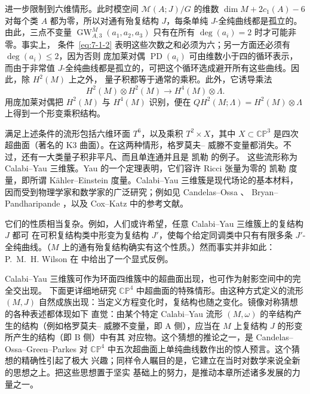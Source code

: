 进一步限制到六维情形。此时模空间 $\mathcal M(A;J)/G$ 的维数
$\dim M+2c_1(A)-6$ 对每个类 $A$ 都为零，所以对通有殆复结构 $J$，每条单纯
$J$-全纯曲线都是孤立的。由此，三点不变量
$\operatorname{GW}_{A,3}^M(a_1,a_2,a_3)$ 只有在所有 $\deg(a_i)=2$ 时才可能非零。事实上，
条件~\eqref{eq:7-1-2} 表明这些次数之和必须为六；另一方面还必须有 $\deg(a_i)\leq2$，因为否则
庞加莱对偶 $\operatorname{PD}(a_i)$ 可由维数小于四的循环表示，而由于非常值
$J$-全纯曲线都是孤立的，可把这个循环选成避开所有这些曲线。因此，除 $H^2(M)$ 上之外，
量子积都等于通常的乘积。此外，它诱导乘法
\[
  H^2(M)\otimes H^2(M)\longrightarrow H^4(M)\otimes\Lambda.
\]
用庞加莱对偶把 $H^2(M)$ 与 $H^4(M)$ 识别，便在
$QH^2(M;\Lambda)=H^2(M)\otimes\Lambda$ 上得到一个形变乘积结构。

满足上述条件的流形包括六维环面 $T^6$，以及乘积 $T^2\times X$，其中
$X\subset\mathbb{CP}^3$ 是四次超曲面（著名的 K3 曲面）。在这两种情形，格罗莫夫--
威滕不变量都消失。不过，还有一大类量子积非平凡、而且单连通并且是 凯勒 的例子。
这些流形称为 Calabi--Yau 三维簇。Yau 的一个定理表明，它们容许 Ricci 张量为零的
凯勒 度量，即所谓 Kähler--Einstein 度量。Calabi--Yau 三维簇是现代场论的基本材料，
因而受到物理学家和数学家的广泛研究；例如见 Candelas--Ossa 、
Bryan--Pandharipande ，以及 Cox--Katz  中的参考文献。

它们的性质相当复杂。例如，人们或许希望，任意 Calabi--Yau 三维簇上的复结构 $J$ 都可
在可积复结构类中形变为复结构 $J'$，使每个给定同调类中只有有限多条
$J'$-全纯曲线。（$M$ 上的通有殆复结构确实有这个性质。）然而事实并非如此：P.~M.~H.
Wilson 在  中给出了一个显式反例。

Calabi--Yau 三维簇可作为环面四维簇中的超曲面出现，也可作为射影空间中的完全交出现。
下面更详细地研究 $\mathbb{CP}^4$ 中超曲面的特殊情形。由这种方式定义的流形 $(M,J)$
自然成族出现：当定义方程变化时，复结构也随之变化。镜像对称猜想的各种表述都体现如下
直觉：由某个特定 Calabi--Yau 流形 $(M,\omega)$ 的辛结构产生的结构（例如格罗莫夫--
威滕不变量，即 A 侧），应当在 $M$ 上复结构 $J$ 的形变所产生的结构（即 B 侧）中有其
对应物。这个猜想的推论之一，是 Candelas--Ossa--Green--Parkes  对
$\mathbb{CP}^4$ 中五次超曲面上单纯曲线数作出的惊人预言。这个猜想的精确性引起了极大
兴趣；同样令人瞩目的是，它建立在当时对数学来说全新的思想之上。把这些思想置于坚实
基础上的努力，是推动本章所述诸多发展的力量之一。

